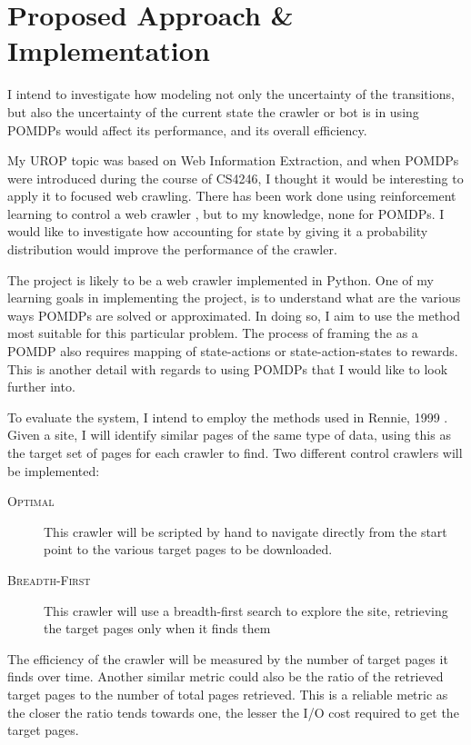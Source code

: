 \documentclass{article}[12 pt]
\begin{document}
\section{Proposed Approach \& Implementation}
I intend to investigate how modeling not only the uncertainty of the transitions, but also the uncertainty of the current state the crawler or bot is in using POMDPs would affect its performance, and its overall efficiency.

My UROP topic was based on Web Information Extraction, and when POMDPs were introduced during the course of CS4246, I thought it would be interesting to apply it to focused web crawling. There has been work done using reinforcement learning to control a web crawler \cite{Perez2003,Rennie1999,Menczer2000}, but to my knowledge, none for POMDPs. I would like to investigate how accounting for state by giving it a probability distribution would improve the performance of the crawler.

The project is likely to be a web crawler implemented in Python. One of my learning goals in implementing the project, is to understand what are the various ways POMDPs are solved or approximated. In doing so, I aim to use the method most suitable for this particular problem. The process of framing the as a POMDP also requires mapping of state-actions or state-action-states to rewards. This is another detail with regards to using POMDPs that I would like to look further into.

To evaluate the system, I intend to employ the methods used in Rennie, 1999 \cite{Rennie1999}. Given a site, I will identify similar pages of the same type of data, using this as the target set of pages for each crawler to find. Two different control crawlers will be implemented:
\begin{description}
	\item[\textsc{Optimal}] This crawler will be scripted by hand to navigate directly from the start point to the various target pages to be downloaded.
	\item[\textsc{Breadth-First}] This crawler will use a breadth-first search to explore the site, retrieving the target pages only when it finds them
\end{description}
The efficiency of the crawler will be measured by the number of target pages it finds over time. Another similar metric could also be the ratio of the retrieved target pages to the number of total pages retrieved. This is a reliable metric as the closer the ratio tends towards one, the lesser the I/O cost required to get the target pages.
\end{document}

